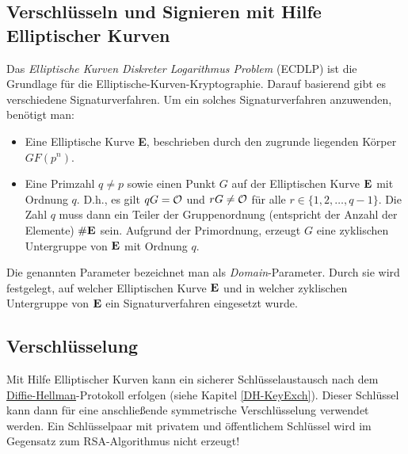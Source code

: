 \begin{refsegment}
\section{Verschlüsseln und Signieren mit Hilfe Elliptischer Kurven}

\begin{sloppypar}
  Das {\em Elliptische Kurven Diskreter Logarithmus
    Problem} (ECDLP)  ist die
  Grundlage für die Elliptische-Kurven-Kryptographie. Darauf basierend gibt es verschiedene Signaturverfahren. Um ein solches Signaturverfahren anzuwenden, benötigt man:
\end{sloppypar}
\begin{itemize}
    \item Eine Elliptische Kurve {\bf E}, beschrieben durch den zugrunde liegenden Körper $GF(p^n)$.
    \item Eine Primzahl $q\ne p$ sowie einen Punkt $G$ auf der Elliptischen Kurve ${\bf E}$ mit Ordnung $q$. D.h., es gilt $qG={\cal O}$ und $rG\ne {\cal O}$ für alle $r\in \{1,2,\dots,q-1\}$. Die Zahl $q$ muss dann ein Teiler der Gruppenordnung (entspricht der Anzahl der Elemente) $\#{\bf E}$ sein. Aufgrund der Primordnung, erzeugt $G$ eine zyklischen Untergruppe von ${\bf E}$ mit Ordnung $q$.
\end{itemize}
Die genannten Parameter bezeichnet man als  {\em Domain}-Para\-meter. Durch sie wird
festgelegt, auf welcher Elliptischen Kurve ${\bf E}$ und in welcher zyklischen Untergruppe von ${\bf E}$ ein
Signaturverfahren eingesetzt  wurde.

\par
\subsection{Verschlüsselung}

Mit Hilfe Elliptischer Kurven kann ein sicherer Schlüsselaustausch nach dem \hyperlink{DH-KeyExch}{Diffie-Hellman}-Protokoll  erfolgen (siehe Kapitel \ref{DH-KeyExch}). Dieser Schlüssel kann dann für eine anschließende symmetrische Verschlüsselung verwendet werden. Ein Schlüsselpaar mit privatem und öffentlichem Schlüssel wird im Gegensatz zum RSA-Algorithmus nicht erzeugt!


\end{refsegment}
